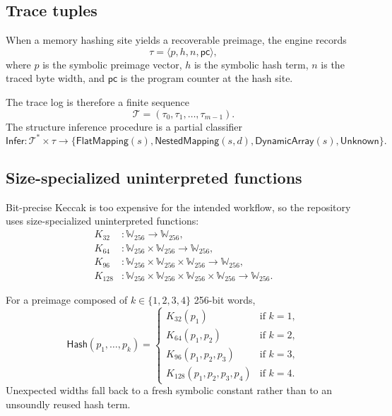 \documentclass[11pt]{article}
\numberwithin{equation}{section}
\theoremstyle{remark}
\newcommand{\Words}[1]{\mathbb{W}_{#1}}
\newcommand{\Trace}{\mathcal{T}}
\newcommand{\PC}{\mathsf{pc}}
\newcommand{\Infer}{\mathsf{Infer}}
\begin{document}
\subsection{Trace tuples}

When a memory hashing site yields a recoverable preimage, the engine records
\begin{equation}
\label{eq:trace-tuple}
\tau = \langle p, h, n, \PC \rangle,
\end{equation}
where \(p\) is the symbolic preimage vector, \(h\) is the symbolic hash term, \(n\) is the traced byte width, and \(\PC\) is the program counter at the hash site.

The trace log is therefore a finite sequence
\begin{equation}
\label{eq:trace-log}
\Trace = (\tau_0,\tau_1,\ldots,\tau_{m-1}).
\end{equation}
The structure inference procedure is a partial classifier
\begin{equation}
\label{eq:infer}
\Infer : \Trace^\ast \times \tau \to
\{
\mathsf{FlatMapping}(s),
\mathsf{NestedMapping}(s,d),
\mathsf{DynamicArray}(s),
\mathsf{Unknown}
\}.
\end{equation}

\subsection{Size-specialized uninterpreted functions}

Bit-precise Keccak is too expensive for the intended workflow, so the repository uses size-specialized uninterpreted functions:
\begin{align}
K_{32} &: \Words{256} \to \Words{256}, \\
K_{64} &: \Words{256}\times\Words{256} \to \Words{256}, \\
K_{96} &: \Words{256}\times\Words{256}\times\Words{256} \to \Words{256}, \\
K_{128} &: \Words{256}\times\Words{256}\times\Words{256}\times\Words{256} \to \Words{256}. \label{eq:keccak-families}
\end{align}

For a preimage composed of \(k \in \{1,2,3,4\}\) 256-bit words,
\begin{equation}
\label{eq:keccak-apply}
\mathsf{Hash}(p_1,\ldots,p_k) =
\begin{cases}
K_{32}(p_1) & \text{if } k = 1, \\
K_{64}(p_1,p_2) & \text{if } k = 2, \\
K_{96}(p_1,p_2,p_3) & \text{if } k = 3, \\
K_{128}(p_1,p_2,p_3,p_4) & \text{if } k = 4.
\end{cases}
\end{equation}
Unexpected widths fall back to a fresh symbolic constant rather than to an unsoundly reused hash term.
\end{document}
